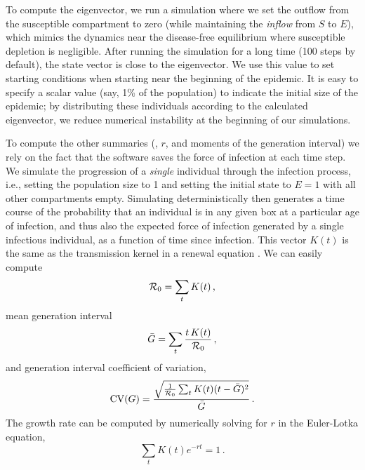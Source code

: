 \documentclass[12pt]{article}\usepackage[]{graphicx}\usepackage[]{color}
\begin{document}
To compute the eigenvector, we run a simulation where we set the outflow from the susceptible compartment to zero (while maintaining the \emph{inflow} from $S$ to $E$), which mimics the dynamics near the disease-free equilibrium where susceptible depletion is negligible. After running the simulation for a long time (100 steps by default), the state vector is close to the eigenvector.  
We use this value to set starting conditions when starting near the beginning of the epidemic. 
It is easy to specify a scalar value (say, 1\% of the population) to indicate the initial size of the epidemic; by distributing these individuals according to the calculated eigenvector, we reduce numerical instability at the beginning of our simulations. 

To compute the other summaries (\Rzero, $r$, and moments of the generation interval) we rely on the fact that the software saves the force of infection at each time step. 
We simulate the progression of a \emph{single} individual through the infection process, i.e., setting the population size to 1 and setting the initial state to $E=1$ with all other compartments empty. 
Simulating deterministically then generates a time course of the probability that an individual is in any given box at a particular age  of infection, and thus also the expected force of infection generated by a single infectious individual, as a function of time since infection. 
This vector $K(t)$ is the same as the transmission kernel in a renewal equation \cite{Cham+18}. 
We can easily compute 
\begin{equation}\label{eq:Rzero}
{\mathcal R}_0 = \sum_t K(t) \,, 
\end{equation}
mean generation interval  
\begin{equation}\label{eq:Gbar}
\bar G = \sum_t \frac{t\,K(t)}{{\mathcal R}_0} \,, 
\end{equation}
and generation interval coefficient of variation,
\begin{equation}\label{eq:GCV}
\textrm{CV}(G) = \frac{\sqrt{\frac{1}{{\mathcal R}_0}\sum_t K(t) (t- \bar G)^2}}{\bar G} \,.
\end{equation}
The growth rate can be computed by numerically solving for $r$ in the Euler-Lotka equation,
\begin{equation}\label{eq:Euler-Lotka}
\sum_t  K(t) e^{-r t} = 1 \,.
\end{equation}

\end{document}
